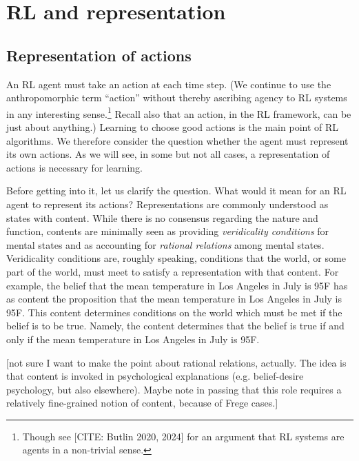 \section{RL and representation}

\subsection{Representation of actions}

An RL agent must take an action at each time step.
(We continue to use the anthropomorphic term ``action'' without thereby ascribing agency to RL systems in any interesting sense.\footnote{Though see [CITE: Butlin 2020, 2024] for an argument that RL systems are agents in a non-trivial sense.}
Recall also that an action, in the RL framework, can be just about anything.)
Learning to choose good actions is the main point of RL algorithms.
We therefore consider the question whether the agent must represent its own actions.
As we will see, in some but not all cases, a representation of actions is necessary for learning.

Before getting into it, let us clarify the question.
What would it mean for an RL agent to represent its actions?
Representations are commonly understood as states with content.
While there is no consensus regarding the nature and function, contents are minimally seen as providing \emph{veridicality conditions} for mental states and as accounting for \emph{rational relations} among mental states.
Veridicality conditions are, roughly speaking, conditions that the world, or some part of the world, must meet to satisfy a representation with that content.
For example, the belief that the mean temperature in Los Angeles in July is 95F has as content the proposition that the mean temperature in Los Angeles in July is 95F.
This content determines conditions on the world which must be met if the belief is to be true.
Namely, the content determines that the belief is true if and only if the mean temperature in Los Angeles in July is 95F.

[not sure I want to make the point about rational relations, actually.
The idea is that content is invoked in psychological explanations (e.g. belief-desire psychology, but also elsewhere).
Maybe note in passing that this role requires a relatively fine-grained notion of content, because of Frege cases.]

